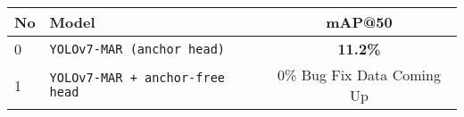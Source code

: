 \begin{tabular}{ l l c }
  \toprule[1.5pt]
  No & Model                                 &mAP@50 \\
  \midrule
  0  & \texttt{YOLOv7-MAR (anchor head)}        & \textbf{11.2\%}\\
  1  & \texttt{YOLOv7-MAR + anchor-free head}       & 0\% Bug Fix Data Coming Up\\
  \bottomrule[1.5pt]
\end{tabular}
